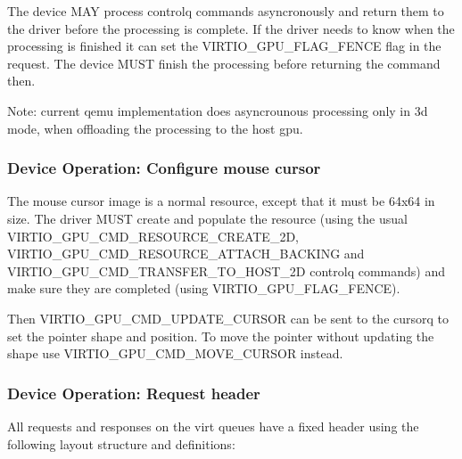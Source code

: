 
The device MAY process controlq commands asyncronously and return them
to the driver before the processing is complete.  If the driver needs
to know when the processing is finished it can set the
VIRTIO_GPU_FLAG_FENCE flag in the request.  The device MUST finish the
processing before returning the command then.

Note: current qemu implementation does asyncrounous processing only in
3d mode, when offloading the processing to the host gpu.

\subsubsection{Device Operation: Configure mouse cursor}

The mouse cursor image is a normal resource, except that it must be
64x64 in size.  The driver MUST create and populate the resource
(using the usual VIRTIO_GPU_CMD_RESOURCE_CREATE_2D,
VIRTIO_GPU_CMD_RESOURCE_ATTACH_BACKING and
VIRTIO_GPU_CMD_TRANSFER_TO_HOST_2D controlq commands) and make sure they
are completed (using VIRTIO_GPU_FLAG_FENCE).

Then VIRTIO_GPU_CMD_UPDATE_CURSOR can be sent to the cursorq to set
the pointer shape and position.  To move the pointer without updating
the shape use VIRTIO_GPU_CMD_MOVE_CURSOR instead.

\subsubsection{Device Operation: Request header}\label{sec:Device Types / GPU Device / Device Operation / Device Operation: Request header}

All requests and responses on the virt queues have a fixed header
using the following layout structure and definitions:

